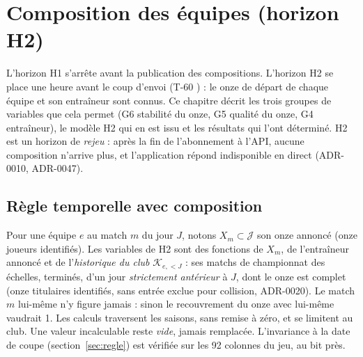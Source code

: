 
\chapter{Composition des équipes (horizon H2)}
\label{chap:composition}

L'horizon H1 s'arrête avant la publication des compositions. L'horizon H2 se place une heure avant le
coup d'envoi (\og T-60 \fg{}) : le onze de départ de chaque équipe et son entraîneur sont connus. Ce chapitre
décrit les trois groupes de variables que cela permet (G6 stabilité du onze, G5 qualité du onze, G4
entraîneur), le modèle H2 qui en est issu et les résultats qui l'ont déterminé. H2 est un horizon de
\emph{rejeu} : après la fin de l'abonnement à l'API, aucune composition n'arrive plus, et l'application
répond \og indisponible \fg{} en direct (ADR-0010, ADR-0047).

\section{Règle temporelle avec composition}
\label{sec:composition-regle}

Pour une équipe \(e\) au match \(m\) du jour \(J\), notons \(X_m \subset \mathcal{J}\) son onze annoncé
(onze joueurs identifiés). Les variables de H2 sont des fonctions de \(X_m\), de l'entraîneur annoncé et
de l'\emph{historique du club} \(\mathcal{K}_{e,<J}\) : ses matchs de championnat des échelles, terminés,
d'un jour \emph{strictement antérieur} à \(J\), dont le onze est complet (onze titulaires identifiés, sans
entrée exclue pour collision, ADR-0020). Le match \(m\) lui-même n'y figure jamais : sinon le recouvrement
du onze avec lui-même vaudrait 1. Les calculs traversent les saisons, sans remise à zéro, et se limitent au
club. Une valeur incalculable reste \emph{vide}, jamais remplacée. L'invariance à la date de coupe
(section~\ref{sec:regle}) est vérifiée sur les 92 colonnes du jeu, au bit près.

